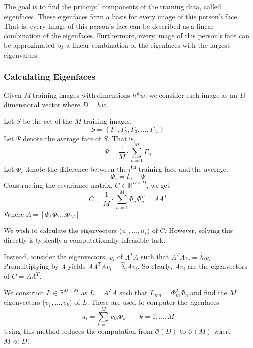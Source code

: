 \documentclass{article}
\begin{document}
The goal is to find the principal components of the training data, called eigenfaces. These eigenfaces form a basis for every image of this person’s face. That is, every image of this person’s face can be described as a linear combination of the eigenfaces. Furthermore, every image of this person’s face can be approximated by a linear combination of the eigenfaces with the largest eigenvalues.

\subsubsection{Calculating Eigenfaces}
Given $M$ training images with dimensions $h$*$w$, we consider each image as an $D$-dimensional vector where $D = hw$.

\vspace{12pt} \noindent Let $S$ be the set of the $M$ training images.
\begin{equation}
	S = \left\{\Gamma_1, \Gamma_2, \Gamma_3, \ldots, \Gamma_M\right\}
\end{equation}
Let $\Psi$ denote the average face of $S$. That is,
\begin{equation}
	\Psi = \frac{1}{M}\cdot\sum_{n=1}^{M}\Gamma_n
\end{equation}
Let $\Phi_i$ denote the difference between the $i$\textsuperscript{th} training face and the average.
\begin{equation}
	\Phi_i = \Gamma_i - \Psi
\end{equation}
Constructing the covariance matrix, $C \in \mathbb{R}^{D\times D}$, we get
\begin{equation}
	C = \frac{1}{M}\cdot\sum_{n=1}^{M}\Phi_n \Phi_n^T
	  = AA^T
\end{equation}
Where $A = [\Phi_1 \Phi_2 \ldots \Phi_M]$

We wish to calculate the eigenvectors ($u_1, \ldots, u_s$) of $C$. However, solving this directly is typically a computationally infeasible task.

Instead, consider the eigenvectors, $v_i$ of $A^TA$ such that $A^TAv_i=\widehat{\lambda}_iv_i$. Premultiplying by $A$ yields $AA^TAv_i=\widehat{\lambda}_iAv_i$. So clearly, $Av_i$ are the eigenvectors of $C=AA^T$.

We construct $L \in \mathbb{R}^{M\times M}$ as $L = A^T A$ such that $L_{mn} = \Phi^T_m \Phi_n$ and find the $M$ eigenvectors ($v_1, \ldots, v_k$) of $L$. These are used to computer the eigenfaces
\begin{equation}
	u_l = \sum_{k=1}^{M}v_{lk}\Phi_k \qquad k=1, \ldots, M
\end{equation}
Using this method reduces the computation from $\mathcal{O}(D)$ to $\mathcal{O}(M)$ where $M\ll D$.
\end{document}
